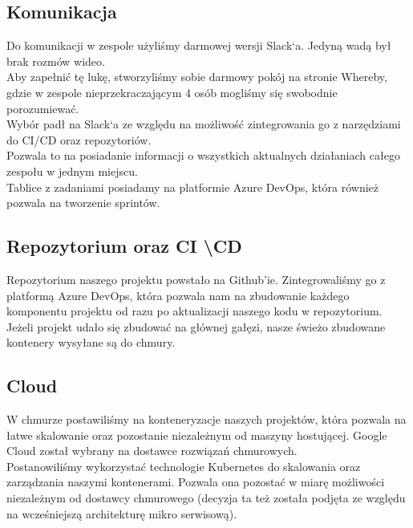 \documentclass[a4paper,11pt]{report}
\begin{document}
\subsection {Komunikacja}
Do komunikacji w zespole użyliśmy darmowej wersji Slack`a. Jedyną wadą był brak rozmów wideo.\\
Aby zapełnić tę lukę, stworzyliśmy sobie darmowy pokój na stronie Whereby, gdzie w zespole nieprzekraczającym 4
osób mogliśmy się swobodnie porozumiewać.\\
Wybór padł na Slack`a ze względu na możliwość zintegrowania go z narzędziami do CI/CD oraz repozytoriów.\\
Pozwala to na posiadanie informacji o wszystkich aktualnych działaniach całego zespołu w jednym miejscu.\\
Tablice z zadaniami posiadamy na platformie Azure DevOps, która również pozwala na tworzenie sprintów.\\
\subsection{Repozytorium oraz CI \textbackslash CD}
Repozytorium naszego projektu powstało na Github'ie. Zintegrowaliśmy go z platformą Azure DevOps, 
która pozwala nam na zbudowanie każdego komponentu projektu od razu po aktualizacji naszego kodu w repozytorium.\\
Jeżeli projekt udało się zbudować na głównej gałęzi, nasze świeżo zbudowane kontenery wysyłane są do chmury.\\
\subsection{Cloud}
W chmurze postawiliśmy na konteneryzacje naszych projektów, która pozwala na łatwe
skalowanie oraz pozostanie niezależnym od maszyny hostującej. Google Cloud został wybrany na dostawce rozwiązań chmurowych.\\
Postanowiliśmy wykorzystać technologie Kubernetes do skalowania oraz zarządzania naszymi kontenerami. Pozwala ona pozostać w miarę możliwości
niezależnym od dostawcy chmurowego (decyzja ta też została podjęta ze względu na wcześniejszą architekturę mikro serwisową).
\end{document}
